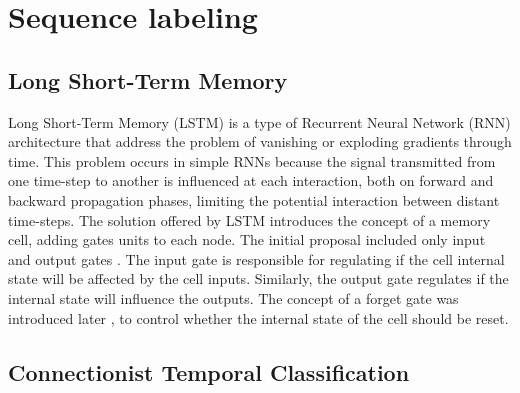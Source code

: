 \section{\label{sec:sequencelabeling}Sequence labeling}





\subsection{\label{sec:lstm}Long Short-Term Memory}
Long Short-Term Memory\cite{hochreiter_long_1997} (LSTM) is a type of Recurrent Neural Network (RNN) architecture that address the problem of vanishing or exploding gradients through time. This problem occurs in simple RNNs because the signal transmitted from one time-step to another is influenced at each interaction, both on forward and backward propagation phases, limiting the potential interaction between distant time-steps. The solution offered by LSTM introduces the concept of a memory cell, adding gates units to each node. The initial proposal included only input and output gates \cite{hochreiter_long_1997}. The input gate is responsible for regulating if the cell internal state will be affected by the cell inputs. Similarly, the output gate regulates if the internal state will influence the outputs. The concept of a forget gate was introduced later \cite{gers_learning_1999}, to control whether the internal state of the cell should be reset.



\subsection{\label{sec:ctc}Connectionist Temporal Classification}



